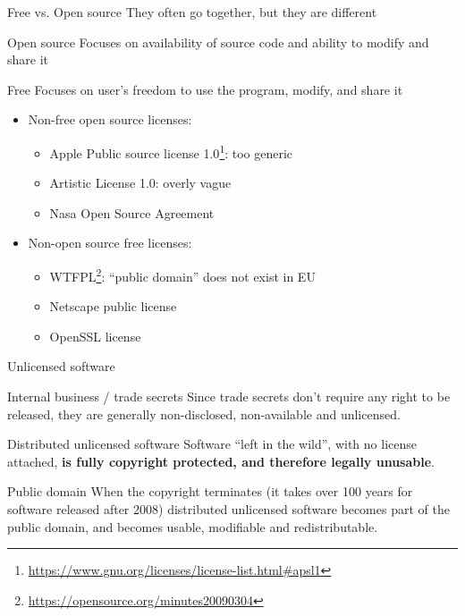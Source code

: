 \documentclass[presentation]{beamer}
\newcommand{\fnurl}[1]{\footnote{\url{#1}}}
\begin{document}
\begin{frame}{Free vs. Open source}
    They often go together, but they are different
    \begin{block}{Open source}
        Focuses on availability of source code and ability to modify and share it
    \end{block}
    \begin{block}{Free}
        Focuses on user's freedom to use the program, modify, and share it
    \end{block}
    \begin{itemize}
        \item Non-free open source licenses:
        \begin{itemize}
            \item Apple Public source license 1.0\fnurl{https://www.gnu.org/licenses/license-list.html\#apsl1}: too generic
            \item Artistic License 1.0: overly vague
            \item Nasa Open Source Agreement
        \end{itemize}
        \item Non-open source free licenses:
        \begin{itemize}
            \item WTFPL\fnurl{https://opensource.org/minutes20090304}: ``public domain'' does not exist in EU
            \item Netscape public license
            \item OpenSSL license
        \end{itemize}
    \end{itemize}
\end{frame}

\begin{frame}{Unlicensed software}
    \begin{block}{Internal business / trade secrets}
        Since trade secrets don't require any right to be released, they are generally non-disclosed, non-available and unlicensed.
    \end{block}
    \begin{block}{Distributed unlicensed software}
        Software ``left in the wild'', with no license attached, \textbf{is fully copyright protected, and therefore legally unusable}.
    \end{block}
    \begin{block}{Public domain}
        When the copyright terminates (it takes over 100 years for software released after 2008) distributed unlicensed software becomes part of the public domain, and becomes usable, modifiable and redistributable.
    \end{block}
\end{frame}
\end{document}
